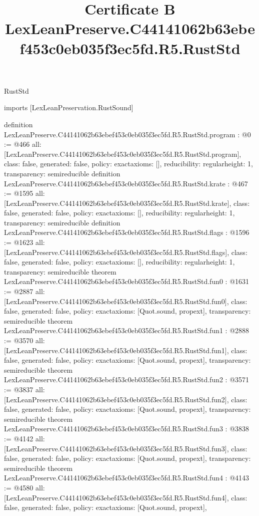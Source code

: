 \begin{lexlean}{RustStd}
\title{Certificate B LexLeanPreserve.C44141062b63ebef453c0eb035f3ec5fd.R5.RustStd}
\begin{coremodule}
imports [LexLeanPreservation.RustSound]

definition LexLeanPreserve.C44141062b63ebef453c0eb035f3ec5fd.R5.RustStd.program : @0 := @466 {
  all: [LexLeanPreserve.C44141062b63ebef453c0eb035f3ec5fd.R5.RustStd.program],
  class: false,
  generated: false,
  policy: exact{axioms: []},
  reducibility: regular{height: 1},
  transparency: semireducible
}
definition LexLeanPreserve.C44141062b63ebef453c0eb035f3ec5fd.R5.RustStd.krate : @467 := @1595 {
  all: [LexLeanPreserve.C44141062b63ebef453c0eb035f3ec5fd.R5.RustStd.krate],
  class: false,
  generated: false,
  policy: exact{axioms: []},
  reducibility: regular{height: 1},
  transparency: semireducible
}
definition LexLeanPreserve.C44141062b63ebef453c0eb035f3ec5fd.R5.RustStd.flags : @1596 := @1623 {
  all: [LexLeanPreserve.C44141062b63ebef453c0eb035f3ec5fd.R5.RustStd.flags],
  class: false,
  generated: false,
  policy: exact{axioms: []},
  reducibility: regular{height: 1},
  transparency: semireducible
}
theorem LexLeanPreserve.C44141062b63ebef453c0eb035f3ec5fd.R5.RustStd.fun0 : @1631 := @2887 {
  all: [LexLeanPreserve.C44141062b63ebef453c0eb035f3ec5fd.R5.RustStd.fun0],
  class: false,
  generated: false,
  policy: exact{axioms: [Quot.sound, propext]},
  transparency: semireducible
}
theorem LexLeanPreserve.C44141062b63ebef453c0eb035f3ec5fd.R5.RustStd.fun1 : @2888 := @3570 {
  all: [LexLeanPreserve.C44141062b63ebef453c0eb035f3ec5fd.R5.RustStd.fun1],
  class: false,
  generated: false,
  policy: exact{axioms: [Quot.sound, propext]},
  transparency: semireducible
}
theorem LexLeanPreserve.C44141062b63ebef453c0eb035f3ec5fd.R5.RustStd.fun2 : @3571 := @3837 {
  all: [LexLeanPreserve.C44141062b63ebef453c0eb035f3ec5fd.R5.RustStd.fun2],
  class: false,
  generated: false,
  policy: exact{axioms: [Quot.sound, propext]},
  transparency: semireducible
}
theorem LexLeanPreserve.C44141062b63ebef453c0eb035f3ec5fd.R5.RustStd.fun3 : @3838 := @4142 {
  all: [LexLeanPreserve.C44141062b63ebef453c0eb035f3ec5fd.R5.RustStd.fun3],
  class: false,
  generated: false,
  policy: exact{axioms: [Quot.sound, propext]},
  transparency: semireducible
}
theorem LexLeanPreserve.C44141062b63ebef453c0eb035f3ec5fd.R5.RustStd.fun4 : @4143 := @4580 {
  all: [LexLeanPreserve.C44141062b63ebef453c0eb035f3ec5fd.R5.RustStd.fun4],
  class: false,
  generated: false,
  policy: exact{axioms: [Quot.sound, propext]},
}
\end{coremodule}
\end{lexlean}
